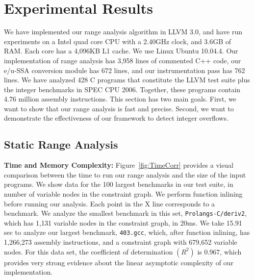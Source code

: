 \documentclass[preprint]{sigplanconf}[10pt]
\begin{document}
\section{Experimental Results}
\label{sec:exp}

We have implemented our range analysis algorithm in LLVM 3.0, and have run
experiments on a Intel quad core CPU with a 2.40GHz clock, and 3.6GB of RAM.
Each core has a 4,096KB L1 cache.
We use Linux Ubuntu 10.04.4.
Our implementation of range analysis has 3,958 lines of
commented C++ code, our e/u-SSA conversion module has 672 lines, and our
instrumentation pass has 762 lines.
We have analyzed 428 C programs that constitute the LLVM test suite plus the
integer benchmarks in SPEC CPU 2006.
Together, these programs contain 4.76 million assembly instructions.
This section has two main goals.
First, we want to show that our range analysis is fast and precise.
Second, we want to demonstrate the effectiveness of our framework to detect
integer overflows.

\subsection{Static Range Analysis}
\label{sub:range}

\noindent
\textbf{Time and Memory Complexity: }
Figure~\ref{fig:TimeCorr} provides a visual comparison between the time to
run our range analysis and the size of the input programs.
We show data for the 100 largest benchmarks in our test suite, in number
of variable nodes in the constraint graph.
We perform function inlining before running our analysis.
Each point in the X line corresponds to a benchmark.
We analyze the smallest benchmark in this set, \texttt{Prolangs-C/deriv2}, which
has 1,131 variable nodes in the constraint graph, in 20ms.
We take 15.91 sec to analyze our largest benchmark, \texttt{403.gcc}, which,
after function inlining, has 1,266,273 assembly instructions, and a
constraint graph with 679,652 variable nodes.
For this data set, the coefficient of determination $(R^2)$ is 0.967, which
provides very strong evidence about the linear asymptotic complexity of our
implementation.
\end{document}
